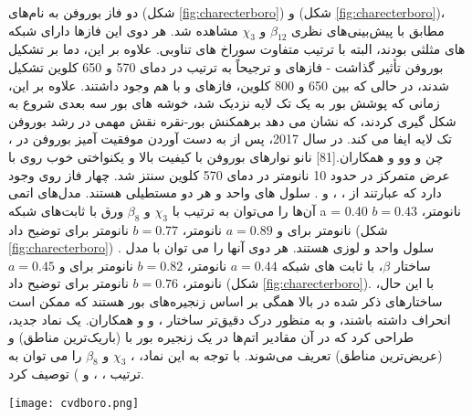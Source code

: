 دو فاز بوروفن به نام‌های  (شکل \ref{fig:charecterboro}) و  (شکل \ref{fig:charecterboro})، مطابق با پیش‌بینی‌های نظری $\beta_{12}$ و $\chi_{3}$ مشاهده شد. هر دوی این فازها دارای شبکه های مثلثی بودند، البته با ترتیب متفاوت سوراخ های تناوبی. علاوه بر این، دما بر تشکیل بوروفن تأثیر گذاشت - فازهای  و  ترجیحاً به ترتیب در دمای 570 و 650 کلوین تشکیل شدند، در حالی که بین 650 و 800 کلوین، فازهای  و  با هم وجود داشتند. علاوه بر این، زمانی که پوشش بور به یک تک لایه نزدیک شد، خوشه های بور سه بعدی شروع به شکل گیری کردند، که نشان می دهد برهمکنش بور-نقره نقش مهمی در رشد بوروفن تک لایه ایفا می کند. در سال 2017، پس از به دست آوردن موفقیت آمیز بوروفن در ، چن و وو و همکاران.[81] نانو نوارهای بوروفن با کیفیت بالا و یکنواختی خوب  روی  با عرض متمرکز در حدود 10 نانومتر در دمای 570 کلوین سنتز شد. چهار فاز روی  وجود دارد که عبارتند از ، ، و . سلول های واحد  و  هر دو مستطیلی هستند. مدل‌های اتمی آن‌ها را می‌توان به ترتیب با $\chi_3$ و $\beta_8$ ورق با ثابت‌های شبکه a = 0.40 نانومتر، $b = 0.43$ نانومتر برای  و $a = 0.89$ نانومتر، $b = 0.77$ نانومتر برای  توضیح داد (شکل \ref{fig:charecterboro}) . سلول واحد  و  لوزی هستند. هر دوی آنها را می توان با مدل ساختار $\beta$، با ثابت های شبکه $a = 0.44$ نانومتر، $b = 0.82$ نانومتر برای  و $a = 0.45$ نانومتر، $b = 0.76$ نانومتر برای  توضیح داد (شکل \ref{fig:charecterboro}). با این حال، ساختارهای ذکر شده در بالا همگی بر اساس زنجیره‌های بور هستند که ممکن است انحراف داشته باشند، و به منظور درک دقیق‌تر ساختار ،  و  و همکاران. یک نماد جدید،  طراحی کرد که در آن مقادیر اتم‌ها در یک زنجیره بور با  (باریک‌ترین مناطق) و  (عریض‌ترین مناطق) تعریف می‌شوند. با توجه به این نماد، ، $\chi_3$  و $\beta_{8}$  را می توان به ترتیب ، ، و ) توصیف کرد.
\begin{figure*}[!ht]
    \centering
    \texttt{[image: cvdboro.png]}
    \caption{}
    \label{fig:cvdboro}
\end{figure*}
